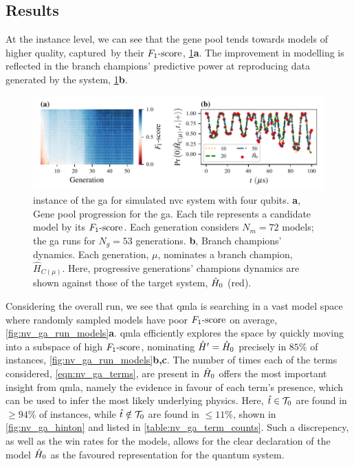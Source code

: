 \subsection{Results}
At the \gls{instance} level, we can see that the gene pool tends towards models of higher quality, 
    captured\footnotemark \ by their $ F_{1}\text{-score} $, \cref{fig:nv_ga_instance}\textbf{a}. 
The improvement in modelling is reflected in the branch champions' predictive power at 
    reproducing data generated by the system, \cref{fig:nv_ga_instance}\textbf{b}. 
\begin{figure}
    \begin{center}
        \includegraphics{experimental_study/figures/nv_ga_instance_horiz.pdf}
    \end{center}
    \caption[Instance of genetic algorithm for simulated nitrogen-vacancy centre system with four qubits]{
        \Gls{instance} of the \acrfull{ga} for simulated \acrlong{nvc} system with four qubits.       
        \textbf{a}, Gene pool progression for the \gls{ga}. Each tile represents a candidate model by its $ F_{1}\text{-score} $. 
        Each generation considers $N_m=72$ models; the \gls{ga} runs for $N_g=53$ generations. 
        \textbf{b}, Branch champions' dynamics. 
        Each generation, $\mu$, nominates a branch champion, $\hat{H}_{C(\mu)}$. 
        Here, progressive generations' champions dynamics are shown against those of the target system, $\hat{H}_0$ (red). 
    }
    \label{fig:nv_ga_instance}
\end{figure}
\par 

Considering the overall \gls{run}, 
    we see that \gls{qmla} is searching in a vast \gls{model space} where randomly sampled models
    have poor $ F_{1}\text{-score} $ on average, \cref{fig:nv_ga_run_models}\textbf{a}. 
\gls{qmla} efficiently explores the space by quickly moving into a 
    subspace of high $ F_{1}\text{-score} $, nominating $\hat{H}^{\prime} = \hat{H}_0$ precisely in $85\%$ of instances,
    \cref{fig:nv_ga_run_models}\textbf{b,c}.
The number of times each of the terms considered, \cref{eqn:nv_ga_terms}, 
    are present in $\hat{H}_0$ offers the most important insight from \gls{qmla}, 
    namely the evidence in favour of each term's presence, 
    which can be used to infer the most likely underlying physics. 
Here, $\hat{t} \in \mathcal{T}_0$ are found in $\geq 94\%$ of instances, 
    while $\hat{t} \notin \mathcal{T}_0$ are found in $\leq 11\%$, 
    shown in \cref{fig:nv_ga_hinton} and listed in \cref{table:nv_ga_term_counts}.
Such a discrepency, as well as the \glspl{win rate} for the models, 
    allows for the clear declaration of the model $\hat{H}_0$ as the favoured representation 
    for the quantum system. 

